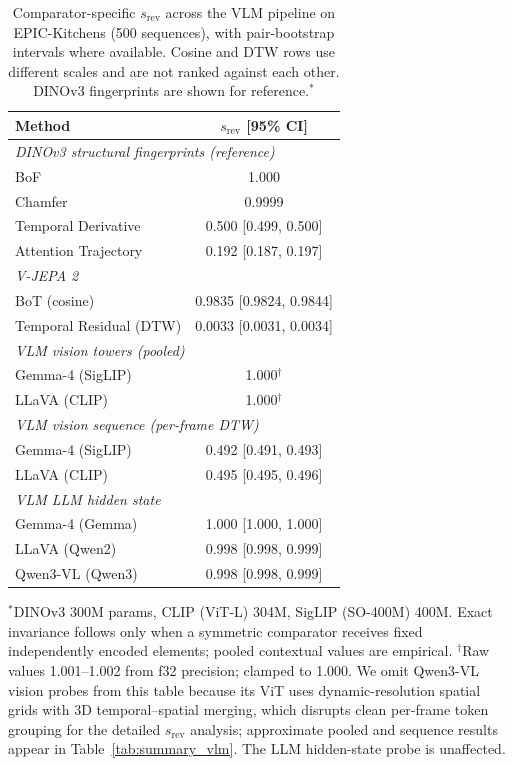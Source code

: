 \documentclass{article}
\theoremstyle{remark}
\begin{document}
\begin{table}[ht]
\centering
\caption{Comparator-specific $s_\text{rev}$ across the VLM pipeline on EPIC-Kitchens (500 sequences), with pair-bootstrap intervals where available. Cosine and DTW rows use different scales and are not ranked against each other. DINOv3 fingerprints are shown for reference.$^*$}
\label{tab:vlm_embedding}
\begin{tabular}{lc}
\toprule
\textbf{Method} & $s_\text{rev}$ \textbf{[95\% CI]} \\
\midrule
\multicolumn{2}{l}{\emph{DINOv3 structural fingerprints (reference)}} \\
\quad BoF & 1.000 \\
\quad Chamfer & 0.9999 \\
\quad Temporal Derivative & 0.500 [0.499, 0.500] \\
\quad Attention Trajectory & 0.192 [0.187, 0.197] \\
\midrule
\multicolumn{2}{l}{\emph{V-JEPA 2}} \\
\quad BoT (cosine) & 0.9835 [0.9824, 0.9844] \\
\quad Temporal Residual (DTW) & 0.0033 [0.0031, 0.0034] \\
\midrule
\multicolumn{2}{l}{\emph{VLM vision towers (pooled)}} \\
\quad Gemma-4 (SigLIP) & 1.000$^\dagger$ \\
\quad LLaVA (CLIP) & 1.000$^\dagger$ \\
\midrule
\multicolumn{2}{l}{\emph{VLM vision sequence (per-frame DTW)}} \\
\quad Gemma-4 (SigLIP) & 0.492 [0.491, 0.493] \\
\quad LLaVA (CLIP) & 0.495 [0.495, 0.496] \\
\midrule
\multicolumn{2}{l}{\emph{VLM LLM hidden state}} \\
\quad Gemma-4 (Gemma) & 1.000 [1.000, 1.000] \\
\quad LLaVA (Qwen2) & 0.998 [0.998, 0.999] \\
\quad Qwen3-VL (Qwen3) & 0.998 [0.998, 0.999] \\
\bottomrule
\end{tabular}
\begin{flushleft}
\small $^*$DINOv3 300M params, CLIP (ViT-L) 304M, SigLIP (SO-400M) 400M. Exact invariance follows only when a symmetric comparator receives fixed independently encoded elements; pooled contextual values are empirical. $^\dagger$Raw values 1.001--1.002 from f32 precision; clamped to 1.000. We omit Qwen3-VL vision probes from this table because its ViT uses dynamic-resolution spatial grids with 3D temporal--spatial merging, which disrupts clean per-frame token grouping for the detailed $s_\text{rev}$ analysis; approximate pooled and sequence results appear in Table~\ref{tab:summary_vlm}. The LLM hidden-state probe is unaffected.
\end{flushleft}
\end{table}
\end{document}
